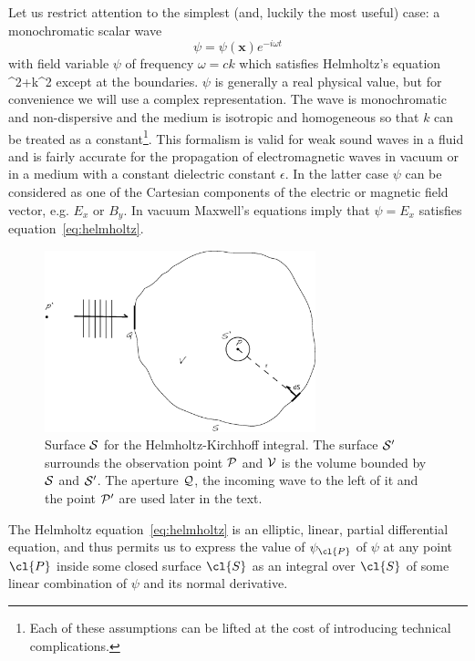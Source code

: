 Let us restrict attention to the simplest (and, luckily the most
useful) case: a monochromatic scalar wave 
\[
\psi=\psi({\mathbf x})e^{-i\omega t}
\]
with field variable $\psi$ of frequency $\omega=ck$ which satisfies Helmholtz's equation
\be
\nabla^2\psi+k^2
\label{eq:helmholtz}
\ee
except at the boundaries. $\psi$ is generally a real physical value, but for convenience we will
use a complex representation. The wave is monochromatic and non-dispersive and the medium is
isotropic and homogeneous so that $k$ can be treated as a constant\footnote{Each of these 
assumptions can be lifted at the cost of introducing technical complications.}. This formalism
is valid for weak sound waves in a fluid and is fairly accurate for the propagation of 
electromagnetic waves in vacuum or in a medium with a constant dielectric constant $\epsilon$. 
In the latter case $\psi$ can be considered as one of the Cartesian components of the electric
or magnetic field vector, e.g. $E_x$ or $B_y$. In vacuum Maxwell's equations imply that 
$\psi=E_x$ satisfies equation~\ref{eq:helmholtz}. 

\begin{figure}[th!]
	\centering
	\includegraphics[width=0.7\textwidth]{helmholz-kirchhoff-surface.eps}
  \caption{Surface $\cal{S}$ for the Helmholtz-Kirchhoff integral. The surface
$\cal{S'}$ surrounds the observation point $\cal{P}$ and $\cal{V}$ is the 
volume bounded by $\cal{S}$ and $\cal{S'}$. The aperture $\cal{Q}$, the 
incoming wave to the left of it and the point $\cal{P'}$ are used later in the
text.}
  \label{fig:helmholz-kirchhoff-surface}
\end{figure}

The Helmholtz equation~\ref{eq:helmholtz} is an elliptic, linear, partial differential equation,
and thus permits us to express the value of $\psi_\cl{P}$ of $\psi$ at any point $\cl{P}$ inside
some closed surface $\cl{S}$ as an integral over $\cl{S}$ of some linear combination of $\psi$ 
and its normal derivative. 

